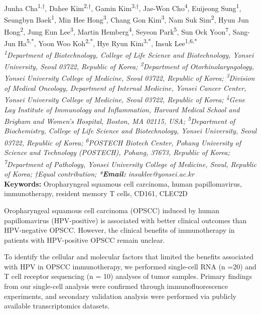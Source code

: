 \begin{center}
Junha Cha\textsuperscript{1,†}, Dahee Kim\textsuperscript{2,†}, Gamin Kim\textsuperscript{3,†}, Jae-Won Cho\textsuperscript{4}, Euijeong Sung\textsuperscript{1}, Seungbyn Baek\textsuperscript{1}, Min Hee Hong\textsuperscript{3}, Chang Gon Kim\textsuperscript{3}, Nam Suk Sim\textsuperscript{2}, Hyun Jun Hong\textsuperscript{2}, Jung Eun Lee\textsuperscript{3}, Martin Hemberg\textsuperscript{4}, Seyeon Park\textsuperscript{5}, Sun Ock Yoon\textsuperscript{7}, Sang-Jun Ha\textsuperscript{5,*}, Yoon Woo Koh\textsuperscript{2,*}, Hye Ryun Kim\textsuperscript{3,*}, Insuk Lee\textsuperscript{1,6,*} \\
\vspace{0.3cm}
\textit{\textsuperscript{1}Department of Biotechnology, College of Life Science and Biotechnology, Yonsei University, Seoul 03722, Republic of Korea; \textsuperscript{2}Department of Otorhinolaryngology, Yonsei University College of Medicine, Seoul 03722, Republic of Korea; \textsuperscript{3}Division of Medical Oncology, Department of Internal Medicine, Yonsei Cancer Center, Yonsei University College of Medicine, Seoul 03722, Republic of Korea; \textsuperscript{4}Gene Lay Institute of Immunology and Inflammation, Harvard Medical School and Brigham and Women’s Hospital, Boston, MA 02115, USA; \textsuperscript{5}Department of Biochemistry, College of Life Science and Biotechnology, Yonsei University, Seoul 03722, Republic of Korea; \textsuperscript{6}POSTECH Biotech Center, Pohang University of Science and Technology (POSTECH), Pohang, 37673, Republic of Korea; \textsuperscript{7}Department of Pathology, Yonsei University College of Medicine, Seoul, Republic of Korea; †Equal contribution; *\textbf{Email:} insuklee@yonsei.ac.kr} \\
\vspace{0.3cm}
\textbf{Keywords:} Oropharyngeal squamous cell carcinoma, human papillomavirus, immunotherapy, resident memory T cells, CD161, CLEC2D
\end{center}

\noindent
Oropharyngeal squamous cell carcinoma (OPSCC) induced by human papillomavirus (HPV-positive) is associated with better clinical outcomes than HPV-negative OPSCC. However, the clinical benefits of immunotherapy in patients with HPV-positive OPSCC remain unclear.

To identify the cellular and molecular factors that limited the benefits associated with HPV in OPSCC immunotherapy, we performed single-cell RNA (n =20) and T cell receptor sequencing (n = 10) analyses of tumor samples. Primary findings from our single-cell analysis were confirmed through immunofluorescence experiments, and secondary validation analysis were performed via publicly available transcriptomics datasets.

